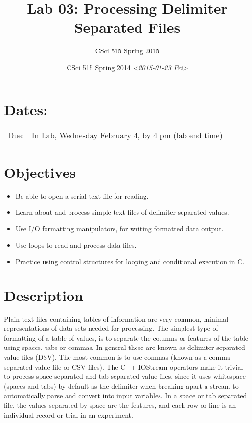 \documentclass[11pt]{article}
\author{CSci 515 Spring 2015}
\date{CSci 515 Spring 2014 \textit{<2015-01-23 Fri>}}
\title{Lab 03: Processing Delimiter Separated Files}
\begin{document}
\maketitle

\section*{Dates:}
\label{sec-1}
\begin{center}
\begin{tabular}{ll}
Due: & In Lab, Wednesday February 4, by 4 pm (lab end time)\\
\end{tabular}
\end{center}
\section*{Objectives}
\label{sec-2}
\begin{itemize}
\item Be able to open a serial text file for reading.
\item Learn about and process simple text files of delimiter separated values.
\item Use I/O formatting manipulators, for writing formatted data output.
\item Use loops to read and process data files.
\item Practice using control structures for looping and conditional
execution in C.
\end{itemize}
\section*{Description}
\label{sec-3}
Plain text files containing tables of information are very common,
minimal representations of data sets needed for processing.  The
simplest type of formatting of a table of values, is to separate the
columns or features of the table using spaces, tabs or commas. In
general these are known as delimiter separated value files (DSV).  The
most common is to use commas (known as a comma separated value file or
CSV files).  The C++ IOStream operators make it trivial to process
space separated and tab separated value files, since it uses
whitespace (spaces and tabs) by default as the delimiter when breaking
apart a stream to automatically parse and convert into input
variables. In a space or tab separated file, the values separated by
space are the features, and each row or line is an individual record
or trial in an experiment.
\end{document}
